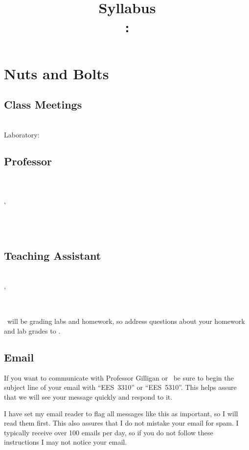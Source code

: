 \documentclass[11pt,twoside]{jgsyllabus}\usepackage[]{graphicx}\usepackage[]{color}
\title{Syllabus\\
\ShortCourseNumber: \LongCourseName}
\begin{document}
\maketitle
\tableofcontents

\clearpage
\section[Nuts \& Bolts]{Nuts and Bolts}
\label{sec:NutsAndBolts}
\subsection{Class Meetings}
\ClassMeetings\\
Laboratory: \LabMeetings
\subsection{Professor}
\label{sec:Professor}
\ProfName\\
\ProfDescr\\
\ProfOffice,\\
\ProfPhone\\
\ProfEmail\\
\ProfWeb\\
\ProfOfficeHours
%

\subsection{Teaching Assistant}
\label{sec:TA}
\TaName\\
\TaOfficeLoc\ifTaPhone,\\
\TaPhone\fi\\
\TaEmail\\
\TaOfficeHours
\medskip

\noindent
\TaTitle\ will be grading labs and homework, so address questions about your homework and lab grades
to \TaAccusative.

\subsection{Email}
If you want to communicate with Professor Gilligan or \TaTitle\ be sure to begin the
subject line of your email with ``{\scshape EES~3310}'' or ``{\scshape EES~5310}''. This helps assure
that we will see your message quickly and respond to it.

I have set my email reader to flag all messages like this as important, so I will read
them first. This also assures that I do not mistake your email for spam. I typically
receive over 100 emails per day, so if you do not follow these instructions I may not
notice your email.
\end{document}

